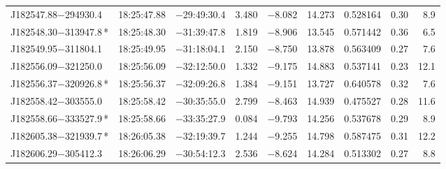 \begin{table*}
\begin{tabular}{lcccccccr}
J182547.88$-$294930.4 & 18:25:47.88 & $-$29:49:30.4 &  3.480 & $-$8.082 & 14.273 & 0.528164 & 0.30 & 8.9 \\
J182548.30$-$313947.8\,* & 18:25:48.30 & $-$31:39:47.8 &  1.819 & $-$8.906 & 13.545 & 0.571442 & 0.36 & 6.5 \\
J182549.95$-$311804.1 & 18:25:49.95 & $-$31:18:04.1 &  2.150 & $-$8.750 & 13.878 & 0.563409 & 0.27 & 7.6 \\
J182556.09$-$321250.0 & 18:25:56.09 & $-$32:12:50.0 &  1.332 & $-$9.175 & 14.883 & 0.537141 & 0.23 & 12.1 \\
J182556.37$-$320926.8\,* & 18:25:56.37 & $-$32:09:26.8 &  1.384 & $-$9.151 & 13.727 & 0.640578 & 0.32 & 7.6 \\
J182558.42$-$303555.0 & 18:25:58.42 & $-$30:35:55.0 &  2.799 & $-$8.463 & 14.939 & 0.475527 & 0.28 & 11.6 \\
J182558.66$-$333527.9\,* & 18:25:58.66 & $-$33:35:27.9 &  0.084 & $-$9.793 & 14.256 & 0.537678 & 0.29 & 8.9 \\
J182605.38$-$321939.7\,* & 18:26:05.38 & $-$32:19:39.7 &  1.244 & $-$9.255 & 14.798 & 0.587475 & 0.31 & 12.2 \\
J182606.29$-$305412.3 & 18:26:06.29 & $-$30:54:12.3 &  2.536 & $-$8.624 & 14.284 & 0.513302 & 0.27 & 8.8 \\
\hline
\end{tabular}
\end{table*}

\addtocounter{table}{-1}

